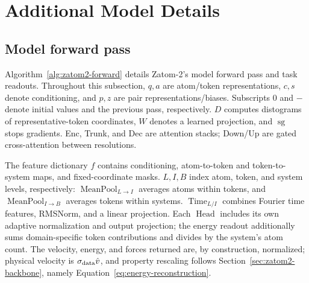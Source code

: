 \documentclass{article} %
\begin{document}
\clearpage
\section{Additional Model Details}
\label{app:additional-model-details}

\subsection{Model forward pass}
\label{app:forward-pass-comparison}

Algorithm~\ref{alg:zatom2-forward} details Zatom-2's model forward pass and task readouts. Throughout this subsection, $q,a$ are atom/token representations, $c,s$ denote conditioning, and $p,z$ are pair representations/biases. Subscripts $0$ and $-$ denote initial values and the previous pass, respectively. $D$ computes distograms of representative-token coordinates, $W$ denotes a learned projection, and $\operatorname{sg}$ stops gradients. Enc, Trunk, and Dec are attention stacks; Down/Up are gated cross-attention between resolutions.

The feature dictionary $f$ contains conditioning, atom-to-token and token-to-system maps, and fixed-coordinate masks. $L,I,B$ index atom, token, and system levels, respectively: $\operatorname{MeanPool}_{L\to I}$ averages atoms within tokens, and $\operatorname{MeanPool}_{I\to B}$ averages tokens within systems. $\operatorname{Time}_{L/I}$ combines Fourier time features, RMSNorm, and a linear projection. Each $\operatorname{Head}$ includes its own adaptive normalization and output projection; the energy readout additionally sums domain-specific token contributions and divides by the system's atom count. The velocity, energy, and forces returned are, by construction, normalized; physical velocity is $\sigma_{\rm data}\hat v$, and property rescaling follows Section~\ref{sec:zatom2-backbone}, namely Equation~\ref{eq:energy-reconstruction}.
\end{document}
